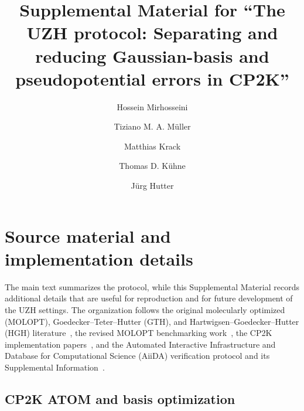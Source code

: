 \documentclass[aps,prb,preprint,amsmath,amssymb,superscriptaddress,longbibliography,floatfix]{revtex4-2}
\begin{document}
\title{Supplemental Material for ``The UZH protocol: Separating and reducing Gaussian-basis and pseudopotential errors in CP2K''}

\author{Hossein Mirhosseini}
\author{Tiziano M. A. M\"uller}
\author{Matthias Krack}
\author{Thomas D. K\"uhne}
\author{J\"urg Hutter}

\maketitle

\section{Source material and implementation details}

The main text summarizes the protocol, while this Supplemental Material records additional details that are useful for reproduction and for future development of the UZH settings. The organization follows the original molecularly optimized (MOLOPT), Goedecker--Teter--Hutter (GTH), and Hartwigsen--Goedecker--Hutter (HGH) literature~\cite{VandeVondele2007,Goedecker1996,Hartwigsen1998}, the revised MOLOPT benchmarking work~\cite{MullerThesis2024}, the CP2K implementation papers~\cite{CP2K2020,CP2KMadeSimple2026}, and the Automated Interactive Infrastructure and Database for Computational Science (AiiDA) verification protocol and its Supplemental Information~\cite{Huber2021,Bosoni2024}.

\subsection{CP2K ATOM and basis optimization}
\end{document}
